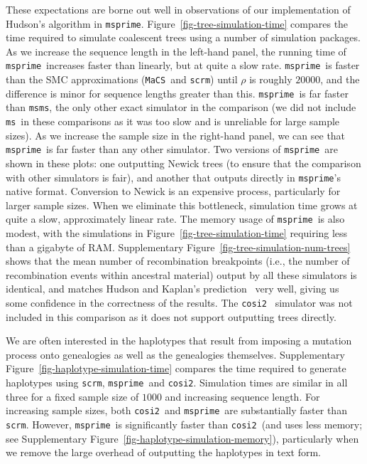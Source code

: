 \documentclass[10pt]{article}
\newcommand{\ms}[0]{\texttt{ms}}
\newcommand{\msms}[0]{\texttt{msms}}
\newcommand{\msprime}[0]{\texttt{msprime}}
\newcommand{\scrm}[0]{\texttt{scrm}}
\newcommand{\cosi}[0]{\texttt{cosi2}}
\newcommand{\MaCS}[0]{\texttt{MaCS}}
\begin{document}
These expectations are borne out well in observations of our implementation of
Hudson's algorithm in \msprime. Figure~\ref{fig-tree-simulation-time} compares
the time required to simulate coalescent trees using a number of simulation
packages. As we increase the sequence length in the left-hand panel, the
running time of \msprime\ increases faster than linearly, but at quite a slow
rate. \msprime\ is faster than the SMC approximations (\MaCS\ and \scrm) until
$\rho$ is roughly $20000$, and the difference is minor for sequence lengths
greater than this. \msprime\ is far faster than \msms, the only other exact
simulator in the comparison (we did not include \ms\ in these comparisons as it
was too slow and is unreliable for large sample sizes). As we increase the
sample size in the right-hand panel, we can see that \msprime\ is far faster
than any other simulator. Two versions of \msprime\ are shown in these plots:
one outputting Newick trees (to ensure that the comparison with other
simulators is fair), and another that outputs directly in \msprime's native
format. Conversion to Newick is an expensive process, particularly for larger
sample sizes.  When we eliminate this bottleneck, simulation time grows
at quite a slow, approximately linear rate. The memory usage of \msprime\ is also
modest, with the simulations in Figure~\ref{fig-tree-simulation-time} requiring
less than a gigabyte of RAM. Supplementary
Figure~\ref{fig-tree-simulation-num-trees} shows
that the mean number of recombination breakpoints (i.e., the number
of recombination events within ancestral material) output by all these
simulators is identical, and matches Hudson and Kaplan's
prediction~\citep{hk85} very well, giving us some confidence in the correctness of the
results. The \cosi~\citep{sss14} simulator was not included in this comparison
as it does not support outputting trees directly.

We are often interested in the haplotypes that result from imposing a mutation
process onto genealogies as well as the genealogies themselves. Supplementary
Figure~\ref{fig-haplotype-simulation-time} compares the time required to
generate haplotypes using \scrm, \msprime\ and \cosi. Simulation times are
similar in all three for a fixed sample size of $1000$ and increasing sequence
length. For increasing sample sizes, both \cosi\ and \msprime\ are
substantially faster than \scrm. However, \msprime\ is significantly faster
than \cosi\ (and uses less memory; see Supplementary
Figure~\ref{fig-haplotype-simulation-memory}), particularly when we remove the
large overhead of outputting the haplotypes in text form.
\end{document}
